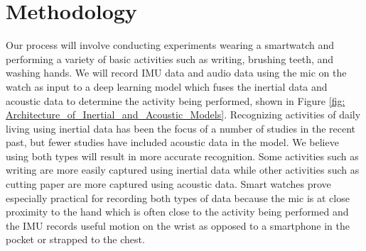 \documentclass[conference]{IEEEtran}
\begin{document}
\section{Methodology}
Our process will involve conducting experiments wearing a smartwatch and performing a variety of basic activities such as writing, brushing teeth, and washing hands. We will record IMU data and audio data using the mic on the watch as input to a deep learning model which fuses the inertial data and acoustic data to determine the activity being performed, shown in Figure \ref{fig: Architecture_of_Inertial_and_Acoustic_Models}. Recognizing activities of daily living using inertial data has been the focus of a number of studies in the recent past, but fewer studies have included acoustic data in the model. We believe using both types will result in more accurate recognition. Some activities such as writing are more easily captured using inertial data while other activities such as cutting paper are more captured using acoustic data.  Smart watches prove especially practical for recording both types of data because the mic is at close proximity to the hand which is often close to the activity being performed and the IMU records useful motion on the wrist as opposed to a smartphone in the pocket or strapped to the chest.
\end{document}
